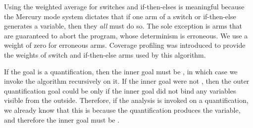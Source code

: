 Using the weighted average for switches and if-then-elses is meaningful because
the Mercury mode system dictates
that if one arm of a switch or if-then-else generates a variable,
then they \emph{all} must do so.
The sole exception is arms that are guaranteed to abort the program,
whose determinism is erroneous.
We use a weight of zero for erroneous arms.
Coverage profiling was introduced to provide the weights of switch and
if-then-else arms used by this algorithm.

If the goal is a quantification,
then the inner goal must be \ddet,
in which case we invoke the algorithm recursively on it.
If the inner goal were not \ddet,
then the outer quantification goal could be \ddet
only if the inner goal did not bind any variables visible from the outside.
Therefore, if the analysis is invoked on a quantification,
we already know that this is because the quantification produces the
variable, and therefore the inner goal must be \ddet.

